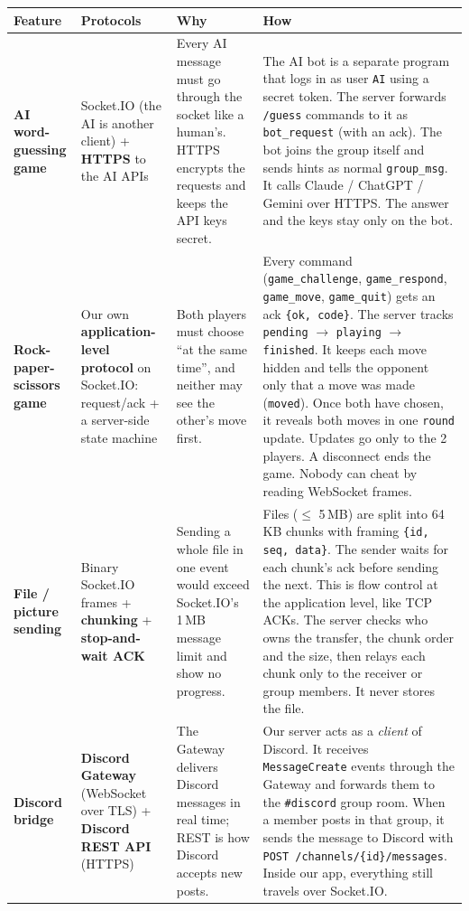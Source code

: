 \documentclass[11pt,a4paper]{article}
\newcommand{\code}[1]{\texttt{#1}}
\begin{document}
{\small
\renewcommand{\arraystretch}{1.35}
\begin{tabularx}{\textwidth}{@{}>{\raggedright\arraybackslash}p{2.3cm} L L >{\raggedright\arraybackslash}p{6.4cm}@{}}
\toprule
\textbf{Feature} & \textbf{Protocols} & \textbf{Why} & \textbf{How} \\
\midrule
\textbf{AI word-guessing game}
& Socket.IO (the AI is another client) + \textbf{HTTPS} to the AI APIs
& Every AI message must go through the socket like a human's. HTTPS encrypts
  the requests and keeps the API keys secret.
& The AI bot is a separate program that logs in as user \code{AI} using a
  secret token. The server forwards \code{/guess} commands to it as
  \code{bot\_request} (with an ack). The bot joins the group itself and sends
  hints as normal \code{group\_msg}. It calls Claude / ChatGPT / Gemini over
  HTTPS. The answer and the keys stay only on the bot. \\
\midrule
\textbf{Rock-paper-scissors game}
& Our own \textbf{application-level protocol} on Socket.IO: request/ack +
  a server-side state machine
& Both players must choose ``at the same time'', and neither may see the
  other's move first.
& Every command (\code{game\_challenge}, \code{game\_respond}, \code{game\_move},
  \code{game\_quit}) gets an ack \code{\{ok, code\}}. The server tracks
  \code{pending} $\rightarrow$ \code{playing} $\rightarrow$ \code{finished}. It
  keeps each move hidden and tells the opponent only that a move was made
  (\code{moved}). Once both have chosen, it reveals both moves in one
  \code{round} update. Updates go only to the 2 players. A disconnect ends the
  game. Nobody can cheat by reading WebSocket frames. \\
\midrule
\textbf{File / picture sending}
& Binary Socket.IO frames + \textbf{chunking} + \textbf{stop-and-wait ACK}
& Sending a whole file in one event would exceed Socket.IO's 1\,MB message
  limit and show no progress.
& Files ($\le$ 5\,MB) are split into 64\,KB chunks with framing
  \code{\{id, seq, data\}}. The sender waits for each chunk's ack before
  sending the next. This is flow control at the application level, like TCP
  ACKs. The server checks who owns the transfer, the chunk order and the size,
  then relays each chunk only to the receiver or group members. It never
  stores the file. \\
\midrule
\textbf{Discord bridge}
& \textbf{Discord Gateway} (WebSocket over TLS) + \textbf{Discord REST API} (HTTPS)
& The Gateway delivers Discord messages in real time; REST is how Discord
  accepts new posts.
& Our server acts as a \emph{client} of Discord. It receives
  \code{MessageCreate} events through the Gateway and forwards them to the
  \code{\#discord} group room. When a member posts in that group, it sends the
  message to Discord with \code{POST /channels/\{id\}/messages}. Inside our app,
  everything still travels over Socket.IO. \\
\bottomrule
\end{tabularx}
}
\end{document}
